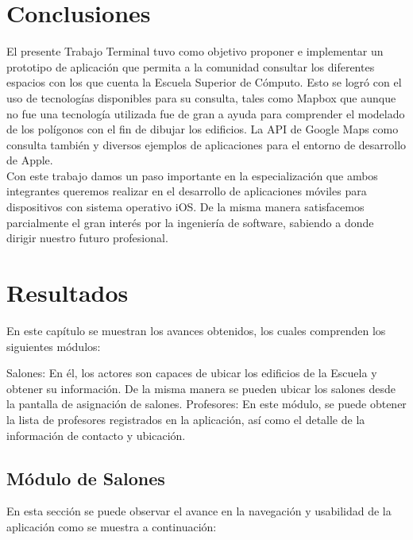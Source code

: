 \section{Conclusiones}

El presente Trabajo Terminal tuvo como objetivo proponer e implementar un prototipo de aplicación que permita a la comunidad consultar los diferentes espacios con los que cuenta la Escuela Superior de Cómputo. Esto se logró con el uso de tecnologías disponibles para su consulta, tales como Mapbox que aunque no fue una tecnología utilizada fue de gran a ayuda para comprender el modelado de los polígonos con el fin de dibujar los edificios. La API de Google Maps como consulta también y diversos ejemplos de aplicaciones para el entorno de desarrollo de Apple.\\

Con este trabajo damos un paso importante en la especialización que ambos integrantes queremos realizar en el desarrollo de aplicaciones móviles para dispositivos con sistema operativo iOS. De la misma manera satisfacemos parcialmente el gran interés por la ingeniería de software, sabiendo a donde dirigir nuestro futuro profesional.

\section{Resultados}

En este capítulo se muestran los avances obtenidos, los cuales comprenden los siguientes módulos:\\

\begin{UClist} 
	\UCli Salones: En él, los actores son capaces de ubicar los edificios de la Escuela y obtener su información. De la misma manera se pueden ubicar los salones desde la pantalla de asignación de salones.
	\UCli Profesores: En este módulo, se puede obtener la lista de profesores registrados en la aplicación, así como el detalle de la información de contacto y ubicación.
\end{UClist} 

\subsection{Módulo de Salones}

En esta sección se puede observar el avance en la navegación y usabilidad de la aplicación como se muestra a continuación:


